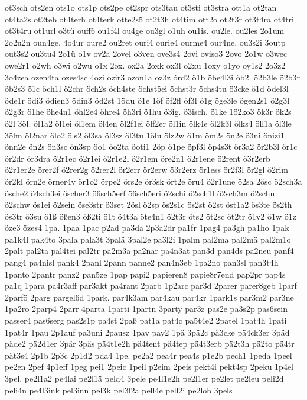 {ot3sch
ots2en
ots1o
ots1p
ots2pe
ot2spr
ots3tau
ot3sti
ot3stra
ott1a
ot2tan
ot4ta2s
ot2teb
ot4terh
ot4terk
otte2s5
ot2t3h
ot4tim
ott2o
ot2t3r
ot3t4ra
ot4tri
ot3t4ru
ot1url
o3tü
ouff6
ou1f4l
ou4ge
ou3gl
o1uh
ou1is.
ou2le.
ou2les
2o1um
2o2u2n
oun4ge.
4o4ur
oure2
ou2ret
ouri4
ourie4
ourme4
our4ne.
ou3s2i
3outp
out3s2
ou3tu4
2o1ü
o1v
ov2a
2ovel
o3ven
ove3s4
2ovi
oviso3
2ovo
2o1w
o3wec
owe2r1
o2wh
o3wi
o2wu
o1x
2ox.
ox2a
2oxk
ox3l
o2xu
1oxy
o1yo
oy1s2
2o3z2
3o4zea
ozen4ta
ozes4sc
4ozi
ozir3
ozon1a
oz3z
órd2
ö1b
öbe4l3i
öb2l
ö2b3le
ö2b3r
öb2s3
ö1c
öch1l
ö2chr
öch2s
öch4ste
öchst5ei
öchst3r
öchs4tu
ö3cke
ö1d
ödel3l
öde1r
ödi3
ödien3
ödin3
öd2st
1ödu
ö1e
1öf
öf2fl
öf3l
ö1g
öge3le
ögen2s1
ö2g3l
ö2g3r
ö1he
öhe4n1
öhl2e4
öhre4
öh3ri
ö1hu
ö3ig.
ö3isch.
ö1ke
1ö2ko3
ök3r
ök2s
ö2l
3öl.
öl1a2
öl1ei
öl1em
öl4en
öl2f1ei
ölf2er
öl1in
ölk4e
öl2k3l
ölks4
öll1a
öl3le
3ölm
öl2nar
ölo2
öls2
öl3sa
öl3sz
öl3tu
1ölu
ölz2w
ö1m
öm2s
ön2e
ö3ni
önizi1
önn2e
ön2s
ön3sc
ön3sp
öo1
öo2ta
öoti1
2öp
ö1pe
öpf3l
öp4s3t
ör3a2
ör2b3l
ör1c
ör2dr
ör3dra
ö2r1ec
ö2r1ei
ö2r1e2l
ö2r1em
öre2n1
ö2r1ene
ö2rent
ö3r2erb
ö2r1er2e
örer2f
ö2rer2g
ö2rer2l
ör2err
ör2erw
ö3r2erz
ör1ess
ör2f3l
ör2gl
ö2rim
ör2kl
örn2e
örner4v
ör1o2
örpe2
örs2e
ör3sk
ört2e
öru4
ö2r1une
ö2sa
2ösc
ö2sch3a
ösche2
ö4sch3ei
öscher3
ö6sch5erf
ö6sch5eri
ö2schi
ö2sch1l
ö2sch3m
ö2schn
ö2schw
ös1ei
ö2sein
öse3str
ö3set
2ösl
ö2sp
ös2s1c
ös2st
ö2st
öst1a2
ös3te
ös2th
ös3tr
ö3su
ö1ß
ößen3
öß2ti
ö1t
ö4t3a
öte4n1
ö2t3r
öts2
öt2sc
öt2tr
ö1v2
ö1w
ö1z
öze3
özes4
1pa.
1paa
1pac
p2ad
pa3da
2p3a2dr
pa1fr
1pag4
pa3gh
pa1ho
1pak
pa1k4l
pak4to
3pala
pala3t
3palä
3pal2e
pa3l2i
1palm
pal2ma
pal2mä
pal2m1o
2palt
pal2ta
pal4tei
pal2tr
pa2m3a
pa2nar
pa4n3at
pan3d
pan4ds
pa2neu
panf4
pang4
pa4nisl
pank4
2panl
2pann
panne2
pan4n3eb
1pa2no
pan3sl
pan3t4h
1panto
2pantr
panz2
pan5ze
1pap
papi2
papieren8
papie8r7end
pap2pr
pap4s
pa1q
1para
pa4r3aff
par3akt
pa4rant
2parb
1p2arc
par3d
2parer
parer8geb
1parf
2parfö
2parg
pargel6d
1park.
par4k3am
par4kau
par4kr
1park1s
par3m2
par3ne
1pa2ro
2parp4
2parr
4parta
1parti
1partn
3party
par3z
pas2e
pa3s2p
pas6sein
passer4
pas6serg
pas2s1p
pa4st
2paß
pat1a
pat4c
pa5t4e2
2patel
1pat4h
1pati
1pat4r
1pau
2p1auf
pa3uni
2pausz
1pav
pay2
1pä
3pä2c
pä3cke
pä4ck3er
3päd
päde2
pä2d1er
3pär
3päs
pä4t1e2h
pä4tent
pä4tep
pä4t3erb
pä2t3h
pä2to
pä4tr
pät3s4
2p1b
2p3c
2p1d2
pda4
1pe.
pe2a2
pea4r
pea4s
p1e2b
pech1
1peda
1peel
pe2en
2pef
4p1eff
1peg
pei1
2peic
1peil
p2eim
2peis
pekt4i
pekt4sp
2peku
1p4el
3pel.
pe2l1a2
pe4lai
pe2l1ä
peld4
3pele
pe4l1e2h
pe2l1er
pe2let
pe2leu
peli2d
peli4n
pe4l3ink
pel3inn
pel3k
pel3l2a
pell4e
pell2i
pe2lob
3pels
}
